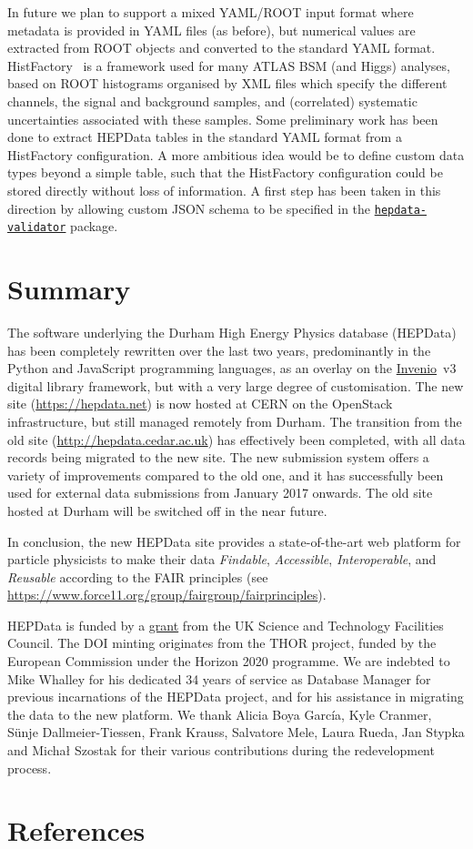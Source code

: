 \documentclass[a4paper]{jpconf}
\begin{document}
In future we plan to support a mixed YAML/ROOT input format where metadata is
provided in YAML files (as before), but numerical values are extracted from
ROOT objects and converted to the standard YAML format.
 HistFactory~\cite{Cranmer:1456844} is a framework used for many ATLAS BSM (and
Higgs) analyses, based on ROOT histograms organised by XML files which specify
the different channels, the signal and background samples, and (correlated)
systematic uncertainties associated with these samples.  Some preliminary work
has been done to extract HEPData tables in the standard YAML format from a
HistFactory configuration.  A more ambitious idea would be to define custom
data types beyond a simple table, such that the HistFactory configuration could
be stored directly without loss of information.  A first step has been taken in
this direction by allowing custom JSON schema to be specified in the
\href{https://github.com/HEPData/hepdata-validator}{\texttt{hepdata-validator}}
package.

\section{Summary}

The software underlying the Durham High Energy Physics database (HEPData) has
been completely rewritten over the last two years, predominantly in the Python
and JavaScript programming languages, as an overlay on the
\href{http://inveniosoftware.org}{Invenio}~v3 digital library framework, but
with a very large degree of customisation.  The new site
(\url{https://hepdata.net}) is now hosted at CERN on the OpenStack
infrastructure, but still managed remotely from Durham.  The transition from
the old site (\url{http://hepdata.cedar.ac.uk}) has effectively been completed,
with all data records being migrated to the new site.  The new submission
system offers a variety of improvements compared to the old one, and it has
successfully been used for external data submissions from January 2017
onwards.  The old site hosted at Durham will be switched off in the near future.

In conclusion, the new HEPData site provides a state-of-the-art web platform
for particle physicists to make their data \emph{Findable}, \emph{Accessible},
\emph{Interoperable}, and \emph{Reusable} according to the FAIR principles (see
\url{https://www.force11.org/group/fairgroup/fairprinciples}).

\ack
HEPData is funded by a
\href{http://gtr.rcuk.ac.uk/projects?ref=ST/N000315/1}{grant} from the UK
Science and Technology Facilities Council.  The DOI minting originates from the
THOR project, funded by the European Commission under the Horizon 2020
programme.  We are indebted to Mike Whalley for his dedicated 34 years of
service as Database Manager for previous incarnations of the HEPData project,
and for his assistance in migrating the data to the new platform.  We thank
Alicia Boya Garc\'{i}a, Kyle Cranmer, S\"unje Dallmeier-Tiessen, Frank Krauss,
Salvatore Mele, Laura Rueda, Jan Stypka and Micha\l{} Szostak for their various
contributions during the redevelopment process.

\section*{References}


\end{document}
